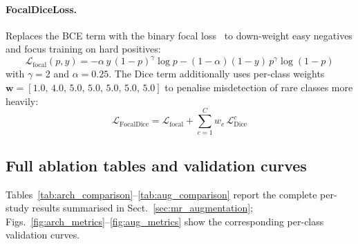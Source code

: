 \begin{appendix}
\paragraph{FocalDiceLoss.}
Replaces the BCE term with the binary focal loss~\citep{lin2017focal} to down-weight easy negatives and focus training on hard positives:
\[
\mathcal{L}_{\text{focal}}(p,y) = -\alpha\,y\,(1-p)^\gamma \log p
                                   -(1-\alpha)(1-y)\,p^\gamma \log(1-p)
\]
with $\gamma=2$ and $\alpha=0.25$. The Dice term additionally uses per-class weights $\mathbf{w} = [1.0,\,4.0,\,5.0,\,5.0,\,5.0,\,5.0,\,5.0]$ to penalise misdetection of rare classes more heavily:
\[
\mathcal{L}_{\text{FocalDice}} = \mathcal{L}_{\text{focal}} + \sum_{c=1}^{C} w_c \,\mathcal{L}_{\text{Dice}}^c
\]

\subsection{Full ablation tables and validation curves}

Tables~\ref{tab:arch_comparison}--\ref{tab:aug_comparison} report the complete per-study results summarised in Sect.~\ref{sec:mr_augmentation}; Figs.~\ref{fig:arch_metrics}--\ref{fig:aug_metrics} show the corresponding per-class validation curves.

\begin{table}[htbp]
\centering
\caption{Architecture ablation on the full dataset (Tesla T4, 30 epochs). Metrics are macro-averaged across the seven classes; Ridge AP is the single-class AP of \texttt{wrinkle\_ridge}.}
\label{tab:arch_comparison}
\end{table}


\end{appendix}
